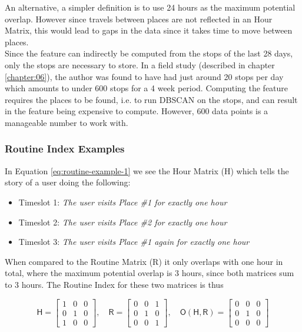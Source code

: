An alternative, a simpler definition is to use 24 hours as the maximum potential overlap. However since travels between places are not reflected in an Hour Matrix, this would lead to gaps in the data since it takes time to move between places. \\

Since the feature can indirectly be computed from the stops of the last 28 days, only the stops are necessary to store. In a field study (described in chapter \ref{chapter:06}), the author was found to have had just around 20 stops per day which amounts to under 600 stops for a 4 week period. Computing the feature requires the places to be found, i.e. to run DBSCAN on the stops, and can result in the feature being expensive to compute. However, 600 data points is a manageable number to work with.

\subsubsection*{Routine Index Examples}

In Equation \eqref{eq:routine-example-1} we see the Hour Matrix (H) which tells the story of a user doing the following:

\begin{itemize}
    \item Timeslot 1: \textit{The user visits Place \#1 for exactly one hour}
    \item Timeslot 2: \textit{The user visits Place \#2 for exactly one hour}
    \item Timeslot 3: \textit{The user visits Place \#1 again for exactly one hour}
\end{itemize}

When compared to the Routine Matrix (R) it only overlaps with one hour in total, where the maximum potential overlap is 3 hours, since both matrices sum to 3 hours. The Routine Index for these two matrices is thus  \label{eq:routine-index-1} 

\begin{equation}
\label{eq:routine-example-1}
    \mathsf{H} = 
    \begin{bmatrix}
    1 & 0 & 0\\
    0 & 1 & 0\\
    1 & 0 & 0
    \end{bmatrix},\quad
    \mathsf{R} = 
    \begin{bmatrix}
    0 & 0 & 1\\
    0 & 1 & 0\\
    0 & 0 & 1
    \end{bmatrix},\quad
    \mathsf{O}(\mathsf{H}, \mathsf{R}) = 
    \begin{bmatrix}
    0 & 0 & 0\\
    0 & 1 & 0\\
    0 & 0 & 0
    \end{bmatrix}
\end{equation}

